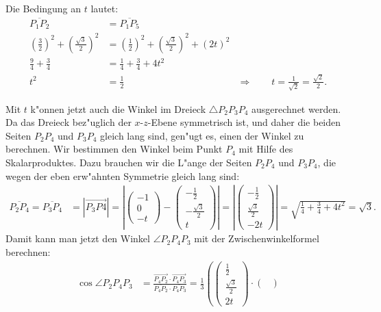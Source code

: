 \begin{loesung}
\begin{teilaufgaben}
\item Die Bedingung an $t$ lautet:
\begin{align*}
\overline{P_1P_2}&=\overline{P_1P_5}\\
\left(\frac32\right)^2+\left(\frac{\sqrt{3}}2\right)^2
	&=\left(\frac12\right)^2+\left(\frac{\sqrt{3}}2\right)^2+(2t)^2\\
\frac94+\frac34&=\frac14+\frac34+4t^2\\
t^2&=\frac12&\Rightarrow\qquad t=\frac1{\sqrt{2}}=\frac{\sqrt{2}}2.
\end{align*}
\item Mit $t$ k"onnen jetzt auch die Winkel im Dreieck $\triangle P_2P_3P_4$
ausgerechnet werden. Da das Dreieck bez"uglich der $x$-$z$-Ebene
symmetrisch ist, und daher die beiden Seiten $P_2P_4$ und $P_3P_4$
gleich lang sind, gen"ugt es, einen der Winkel zu berechnen.
Wir bestimmen den Winkel beim Punkt $P_4$ mit Hilfe des Skalarproduktes.
Dazu brauchen wir die L"ange der Seiten $P_2P_4$ und $P_3P_4$, die wegen der
eben erw"ahnten Symmetrie gleich lang sind:
\begin{align*}
\overline{P_2P_4}=\overline{P_3P_4}
&=|\overrightarrow{P_3P4}|
=
\left|
\begin{pmatrix}
-1\\0\\-t
\end{pmatrix}
-
\begin{pmatrix}
-\frac12\\-\frac{\sqrt{3}}2\\t
\end{pmatrix}
\right|
=
\left|
\begin{pmatrix}
-\frac12\\\frac{\sqrt{3}}2\\-2t
\end{pmatrix}
\right|
=\sqrt{\frac14+\frac34+4t^2}=\sqrt{3}.
\end{align*}
Damit kann man jetzt den Winkel $\angle P_2P_4P_3$ mit der Zwischenwinkelformel
berechnen:
\begin{align*}
\cos\angle P_2P_4P_3
&=\frac{\overrightarrow{P_4P_2}\cdot\overrightarrow{P_4P_3}}{\overline{P_4P_2}\cdot\overline{P_4P_3}}
=\frac13\left(
\begin{pmatrix}
\frac12 \\ \frac{\sqrt{3}}2\\2t
\end{pmatrix}
\cdot
\begin{pmatrix}

\end{pmatrix}
\end{align*}
\end{teilaufgaben}
\end{loesung}
